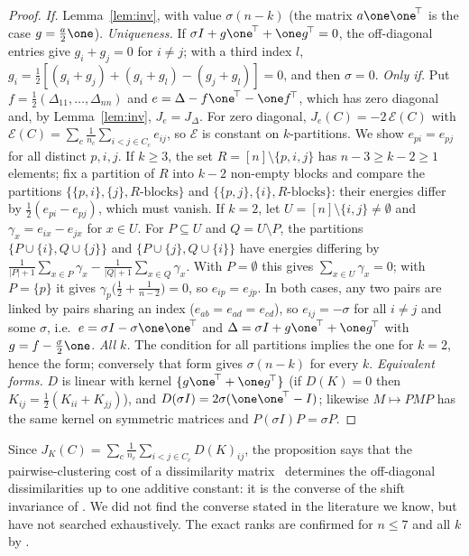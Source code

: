\begin{proof}
\emph{If.} Lemma~\ref{lem:inv}, with value $\sigma(n-k)$ (the matrix $a\one\one^{\!\top}$ is the case $g=\tfrac a2\one$).
\emph{Uniqueness.} If $\sigma I+g\one^{\!\top}+\one g^{\!\top}=0$, the off-diagonal entries give $g_i+g_j=0$ for $i\ne j$; with a third index $l$, $g_i=\tfrac12[(g_i+g_j)+(g_i+g_l)-(g_j+g_l)]=0$, and then $\sigma=0$.
\emph{Only if.} Put $f=\tfrac12(\Delta_{11},\dots,\Delta_{nn})$ and $e=\Delta-f\one^{\!\top}-\one f^{\!\top}$, which has zero diagonal and, by Lemma~\ref{lem:inv}, $J_e=J_\Delta$. For zero diagonal, $J_e(C)=-2\,\mathcal E(C)$ with $\mathcal E(C)=\sum_c\frac1{n_c}\sum_{i<j\in C_c}e_{ij}$, so $\mathcal E$ is constant on $k$-partitions. We show $e_{pi}=e_{pj}$ for all distinct $p,i,j$. If $k\ge3$, the set $R=[n]\setminus\{p,i,j\}$ has $n-3\ge k-2\ge1$ elements; fix a partition of $R$ into $k-2$ non-empty blocks and compare the partitions $\{\{p,i\},\{j\},R\text{-blocks}\}$ and $\{\{p,j\},\{i\},R\text{-blocks}\}$: their energies differ by $\tfrac12(e_{pi}-e_{pj})$, which must vanish. If $k=2$, let $U=[n]\setminus\{i,j\}\neq\emptyset$ and $\gamma_x=e_{ix}-e_{jx}$ for $x\in U$. For $P\subseteq U$ and $Q=U\setminus P$, the partitions $\{P\cup\{i\},Q\cup\{j\}\}$ and $\{P\cup\{j\},Q\cup\{i\}\}$ have energies differing by $\frac1{|P|+1}\sum_{x\in P}\gamma_x-\frac1{|Q|+1}\sum_{x\in Q}\gamma_x$. With $P=\emptyset$ this gives $\sum_{x\in U}\gamma_x=0$; with $P=\{p\}$ it gives $\gamma_p\bigl(\tfrac12+\tfrac1{n-2}\bigr)=0$, so $e_{ip}=e_{jp}$. In both cases, any two pairs are linked by pairs sharing an index ($e_{ab}=e_{ad}=e_{cd}$), so $e_{ij}=-\sigma$ for all $i\ne j$ and some $\sigma$, i.e.\ $e=\sigma I-\sigma\one\one^{\!\top}$ and $\Delta=\sigma I+g\one^{\!\top}+\one g^{\!\top}$ with $g=f-\tfrac\sigma2\one$.
\emph{All $k$.} The condition for all partitions implies the one for $k=2$, hence the form; conversely that form gives $\sigma(n-k)$ for every $k$.
\emph{Equivalent forms.} $D$ is linear with kernel $\{g\one^{\!\top}+\one g^{\!\top}\}$ (if $D(K)=0$ then $K_{ij}=\tfrac12(K_{ii}+K_{jj})$), and $D(\sigma I)=2\sigma(\one\one^{\!\top}-I)$; likewise $M\mapsto PMP$ has the same kernel on symmetric matrices and $P(\sigma I)P=\sigma P$.
\end{proof}

\noindent Since $J_K(C)=\sum_c\frac1{n_c}\sum_{i<j\in C_c}D(K)_{ij}$, the proposition says that the pairwise-clustering cost of a dissimilarity matrix~\citep{hofmann1997} determines the off-diagonal dissimilarities up to one additive constant: it is the converse of the shift invariance of \citet{roth2003}. We did not find the converse stated in the literature we know, but have not searched exhaustively. The exact ranks are confirmed for $n\le7$ and all $k$ by .


